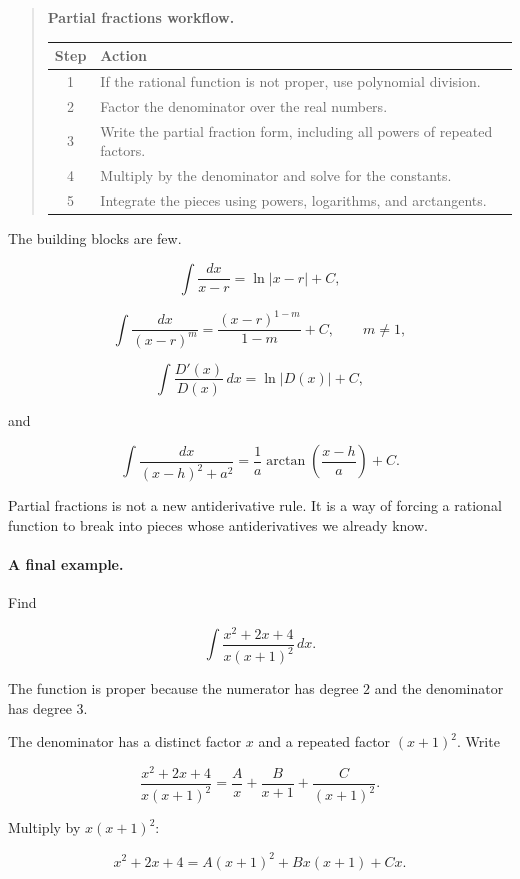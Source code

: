 \begin{quote}
\textbf{Partial fractions workflow.}

\begin{center}
\begin{tabular}{c|p{}}
\textbf{Step} & \textbf{Action} \\ \hline
1 & If the rational function is not proper, use polynomial division. \\[4pt]
2 & Factor the denominator over the real numbers. \\[4pt]
3 & Write the partial fraction form, including all powers of repeated factors. \\[4pt]
4 & Multiply by the denominator and solve for the constants. \\[4pt]
5 & Integrate the pieces using powers, logarithms, and arctangents.
\end{tabular}
\end{center}
\end{quote}

The building blocks are few.

\[
\int \frac{dx}{x-r}=\ln|x-r|+C,
\]

\[
\int \frac{dx}{(x-r)^m}
=
\frac{(x-r)^{1-m}}{1-m}+C,
\qquad m\neq1,
\]

\[
\int \frac{D'(x)}{D(x)}\,dx=\ln|D(x)|+C,
\]

and

\[
\int \frac{dx}{(x-h)^2+a^2}
=
\frac1a\arctan\left(\frac{x-h}{a}\right)+C.
\]

Partial fractions is not a new antiderivative rule.  It is a way of forcing a rational
function to break into pieces whose antiderivatives we already know.

\paragraph{A final example.}
Find

\[
\int \frac{x^2+2x+4}{x(x+1)^2}\,dx.
\]

The function is proper because the numerator has degree \(2\) and the denominator has
degree \(3\).

The denominator has a distinct factor \(x\) and a repeated factor \((x+1)^2\).  Write

\[
\frac{x^2+2x+4}{x(x+1)^2}
=
\frac{A}{x}
+
\frac{B}{x+1}
+
\frac{C}{(x+1)^2}.
\]

Multiply by \(x(x+1)^2\):

\[
x^2+2x+4
=
A(x+1)^2
+
Bx(x+1)
+
Cx.
\]

